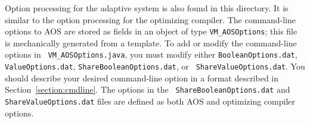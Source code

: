 Option processing for the adaptive system is also found in this
directory.  It is similar to the option processing for the optimizing
compiler.  The command-line options to AOS are
stored as fields in an object of type {\tt VM\_AOSOptions}; this file
is mechanically generated from a template.
To add or modify the command-line options in {\tt
VM\_AOSOptions.java}, you must modify either {\tt BooleanOptions.dat},
{\tt ValueOptions.dat}, {\tt ShareBooleanOptions.dat}, or {\tt
ShareValueOptions.dat}.  You should describe your desired command-line
option in a format described in
Section~\ref{section:cmdline}.  The options in the {\tt
ShareBooleanOptions.dat} and {\tt ShareValueOptions.dat} files are
defined as both AOS and optimizing compiler options.


